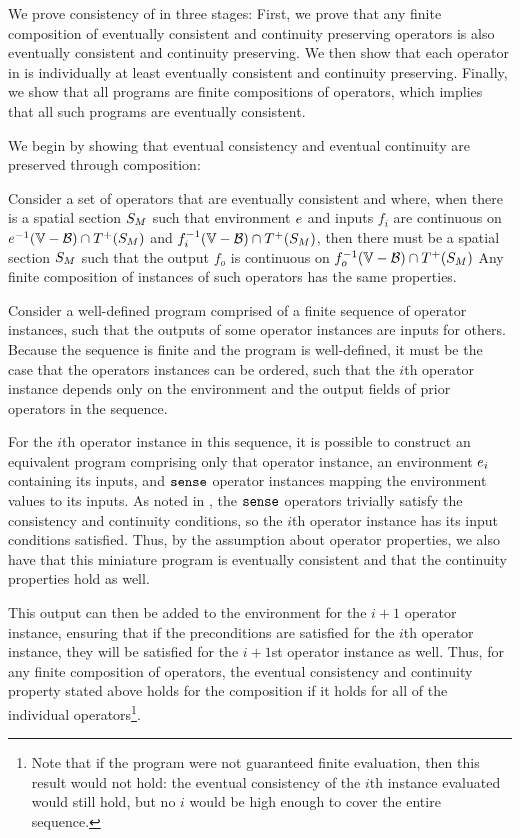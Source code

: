 \documentclass[12pt,a4paper,twoside,openright]{book}
\begin{document}
\begin{appendices}
We prove consistency of \calculus{} in three stages: 
%
First, we prove that any finite composition of eventually consistent and continuity preserving operators is also eventually consistent and continuity preserving.
%
We then show that each operator in \calculus{} is individually at least eventually consistent and continuity preserving.  
%
Finally, we show that all \calculus{} programs are finite compositions of operators, which implies that all such programs are eventually consistent.

We begin by showing that eventual consistency and eventual continuity are preserved through composition:

\begin{lem}\label{thm:compose}
  Consider a set of operators that are eventually consistent and where, when there is a spatial section $S_{M}$ such that environment $e$ and inputs $f_i$ are continuous on $\validdomain{\environment} \cap \futureof{\sectionof{\manifold}}$ and  $\validdomain{\field_i} \cap \futureof{\sectionof{\manifold}}$, then there must be a spatial section $S_{M}$ such that the output $f_o$ is continuous on $\validdomain{\field_o} \cap \futureof{\sectionof{\manifold}}$
  Any finite composition of instances of such operators has the same properties.
\end{lem}
  Consider a well-defined program comprised of a finite sequence of operator instances, such that the outputs of some operator instances are inputs for others.  Because the sequence is finite and the program is well-defined, it must be the case that the operators instances can be ordered, such that the $i$th operator instance depends only on the environment and the output fields of prior operators in the sequence.

  For the $i$th operator instance in this sequence, it is possible to construct an equivalent program comprising only that operator instance, an environment $e_i$ containing its inputs, and $\texttt{sense}$ operator instances mapping the environment values to its inputs.
  As noted in , the $\texttt{sense}$ operators trivially satisfy the consistency and continuity conditions, so the $i$th operator instance has its input conditions satisfied.
  Thus, by the assumption about operator properties, we also have that this miniature program is eventually consistent and that the continuity properties hold as well.

  This output can then be added to the environment for the $i+1$ operator instance, ensuring that if the preconditions are satisfied for the $i$th operator instance, they will be satisfied for the $i+1$st operator instance as well.
  Thus, for any finite composition of operators, the eventual consistency and continuity property stated above holds for the composition if it holds for all of the individual operators\footnote{Note that if the program were not guaranteed finite evaluation, then this result would not hold: the eventual consistency of the $i$th instance evaluated would still hold, but no $i$ would be high enough to cover the entire sequence.}.


\end{appendices}
\end{document}
